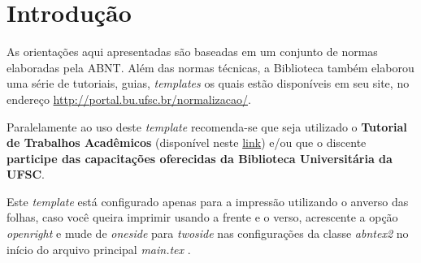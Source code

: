 \documentclass[
	12pt,				%
	oneside,			%
	a4paper,			%
	chapter=TITLE,		%
	section=TITLE,		%
	english,			%
	brazil				%
	]{abntex2}
\begin{document}
{%
	\hypersetup{hidelinks}
	\listoffigures*
	\cleardoublepage

	\listofquadros*
	\cleardoublepage

	\listoftables*
	\cleardoublepage

	\imprimirlistadesiglas

	\imprimirlistadesimbolos

	\tableofcontents*
	\cleardoublepage

}%


\textual

\chapter{Introdução}\label{intro}

As orientações aqui apresentadas são baseadas em um conjunto de normas
elaboradas pela \gls{ABNT}. Além das normas técnicas, a Biblioteca também
elaborou uma série de tutoriais, guias, \emph{templates} os quais estão disponíveis
em seu site, no endereço \url{http://portal.bu.ufsc.br/normalizacao/}.

Paralelamente ao uso deste \emph{template} recomenda-se que seja utilizado o
\textbf{Tutorial de Trabalhos Acadêmicos} (disponível neste
\href{/url\%7Bhttps://repositorio.ufsc.br/handle/123456789/180829}{link}) e/ou que o
discente \textbf{participe das capacitações oferecidas da Biblioteca Universitária da
UFSC}.

Este \emph{template} está configurado apenas para a impressão utilizando o
anverso das folhas, caso você queira imprimir usando a frente e o verso,
acrescente a opção \emph{openright} e mude de \emph{oneside} para
\emph{twoside} nas configurações da classe \emph{abntex2} no início do
arquivo principal \emph{main.tex} \autocite{abntex2classe}.
\end{document}

